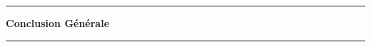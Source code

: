 \newpage
\thispagestyle{empty}
\vspace*{\fill}
\begin{center}
\rule{0.8\textwidth}{0.5pt}

\vspace{1cm}
{\Huge\bfseries Conclusion Générale}
\vspace{1cm}

\rule{0.8\textwidth}{0.5pt}
\end{center}
\vspace*{\fill}
\newpage
